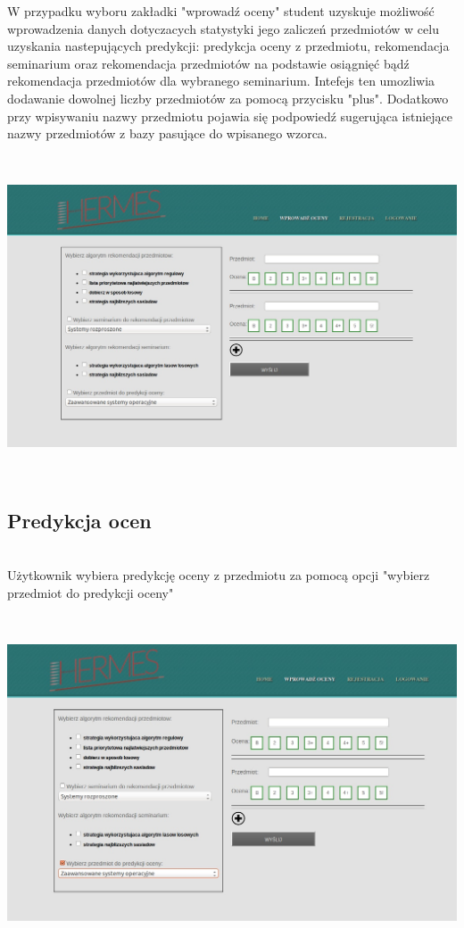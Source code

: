 \documentclass[licencjacka]{pracamgr}
\begin{document}
W przypadku wyboru zakładki "wprowadź oceny" student uzyskuje możliwość wprowadzenia danych dotyczacych statystyki jego zaliczeń przedmiotów w celu uzyskania nastepujących predykcji: predykcja oceny z przedmiotu, rekomendacja seminarium oraz rekomendacja przedmiotów na podstawie osiągnięć bądź rekomendacja przedmiotów dla wybranego seminarium. Intefejs ten umozliwia dodawanie dowolnej liczby przedmiotów za pomocą przycisku "plus". Dodatkowo przy wpisywaniu nazwy przedmiotu pojawia się podpowiedź sugerująca istniejące nazwy przedmiotów z bazy pasujące do wpisanego wzorca.   \par
~\\
\begin{minipage}{\linewidth}
	\centering
           \includegraphics[scale=0.50]{interfejsWstepny.jpg}
\end{minipage} \\ 

\newpage

\subsection{Predykcja ocen}
~\\ \indent
Użytkownik wybiera predykcję oceny z przedmiotu za pomocą opcji "wybierz przedmiot do predykcji oceny" \par
~\\
\begin{minipage}{\linewidth}
	\centering
           \includegraphics[scale=0.5]{predykcjaPrzedmSelect.jpg}
\end{minipage} \\ \\
\end{document}
